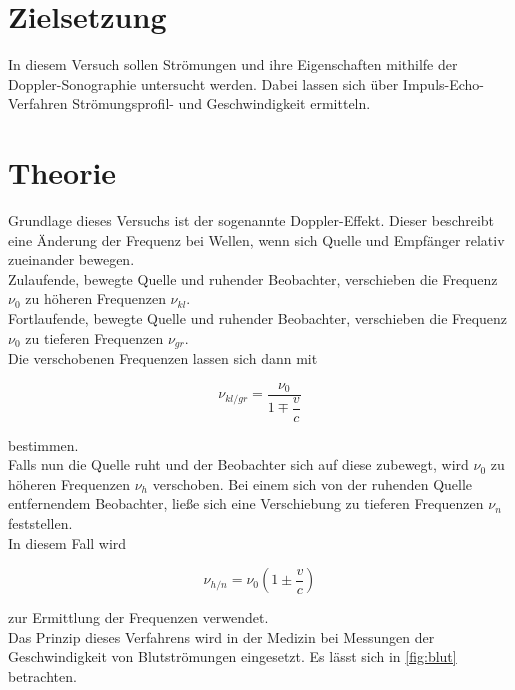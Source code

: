 \section{Zielsetzung}
\label{sec:Ziel}
In diesem Versuch sollen Strömungen und ihre Eigenschaften mithilfe der Doppler-Sonographie untersucht
werden. Dabei lassen sich über Impuls-Echo-Verfahren Strömungsprofil- und Geschwindigkeit ermitteln. 

\section{Theorie}
\label{sec:Theorie}

Grundlage dieses Versuchs ist der sogenannte Doppler-Effekt. Dieser beschreibt eine Änderung der Frequenz 
bei Wellen, wenn sich Quelle und Empfänger relativ zueinander bewegen.\\
\noindent Zulaufende, bewegte Quelle und ruhender Beobachter, verschieben die Frequenz $\nu_0$ zu höheren Frequenzen $\nu_{kl}$.\\
\noindent Fortlaufende, bewegte Quelle und ruhender Beobachter, verschieben die Frequenz  $\nu_0$ zu tieferen Frequenzen  $\nu_{gr}$.\\
\noindent Die verschobenen Frequenzen lassen sich dann mit 

\begin{equation}
    \nu_{kl/gr} = \dfrac{\nu_0}{1\mp\dfrac{v}{c}}
    \label{eq:eins}
\end{equation}

\noindent bestimmen.\\
\noindent Falls nun die Quelle ruht und der Beobachter sich auf diese zubewegt, wird  $\nu_0$ zu höheren Frequenzen $\nu_h$ verschoben. 
Bei einem sich von der ruhenden Quelle entfernendem Beobachter, ließe sich eine Verschiebung zu tieferen Frequenzen  $\nu_n$ feststellen.\\
\noindent In diesem Fall wird 

\begin{equation}
    \nu_{h/n} = \nu_0(1\pm\dfrac{v}{c})
    \label{eq:zwei}
\end{equation}

\noindent zur Ermittlung der Frequenzen verwendet.\\ 
\noindet Das Prinzip dieses Verfahrens wird in der Medizin bei Messungen der Geschwindigkeit von Blutströmungen eingesetzt.
Es lässt sich in \autoref{fig:blut} betrachten.

